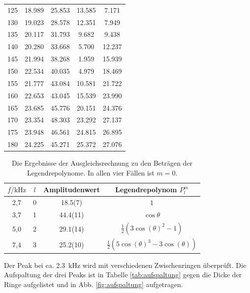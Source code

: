 \begin{table}
\begin{tabular}{S[round-precision=1] S[] S[] S[] S[]}
125 & 18.989 & 25.853 & 13.585 & 7.171 \\
130 & 19.023 & 28.578 & 12.351 & 7.949 \\
135 & 20.117 & 31.793 & 9.682  & 9.438 \\
140 & 20.280 & 33.668 & 5.700  & 12.237 \\
145 & 21.994 & 38.268 & 1.959  & 15.939 \\
150 & 22.534 & 40.035 & 4.979  & 18.469 \\
155 & 21.777 & 43.084 & 10.581 & 21.722 \\
160 & 22.653 & 43.045 & 15.539 & 23.990 \\
165 & 23.685 & 45.776 & 20.151 & 24.376 \\
170 & 23.354 & 48.303 & 23.292 & 27.137 \\
175 & 23.948 & 46.561 & 24.815 & 26.895 \\
180 & 24.225 & 45.271 & 25.372 & 27.076 \\

\bottomrule
\end{tabular}\end{table}



\begin{table}\caption{Die Ergebnisse der Ausgleichsrechnung zu den Beträgen der Legendrepolynome. In allen vier Fällen ist $m = 0$.}
    \label{tab:fit}
    \centering
     \begin{tabular}{c c S[round-precision=1] c} 
    \toprule
{$f / \si{\kilo\hertz}$} & {$l$} & {Amplitudenwert} & Legendrepolynom $P_l^m$ \\
,7     &   0   &  18.5(7)  &   $1$  \\
3,7     &   1   &  44.4(11) &   $\cos \theta$  \\
5,0     &   2   &  29.1(14) &   $\frac{1}{2}(3 \cos(\theta)^2 -1)$  \\ 
7,4     &   3   &  25.2(10) &   $\frac{1}{2} (5  \cos(\theta)^3 -3 \cos(\theta))$  \\

\bottomrule
\end{tabular}\end{table}

Der Peak bei ca. \SI{2.3}{\kilo\hertz} wird mit verschiedenen Zwischenringen überprüft.
Die Aufspaltung der drei Peaks ist in Tabelle \ref{tab:aufspaltung} gegen die Dicke der Ringe aufgelistet und in Abb. \ref{fig:aufspaltung} aufgetragen.

